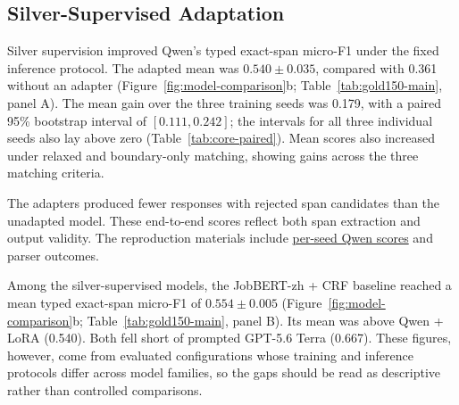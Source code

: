 \subsection{Silver-Supervised Adaptation}
\label{sec:silver-results}

Silver supervision improved Qwen's typed exact-span micro-F1 under the fixed inference protocol. The adapted mean was $0.540\pm0.035$, compared with 0.361 without an adapter (Figure~\ref{fig:model-comparison}b; Table~\ref{tab:gold150-main}, panel A). The mean gain over the three training seeds was 0.179, with a paired 95\% bootstrap interval of $[0.111, 0.242]$; the intervals for all three individual seeds also lay above zero (Table~\ref{tab:core-paired}). Mean scores also increased under relaxed and boundary-only matching, showing gains across the three matching criteria.

The adapters produced fewer responses with rejected span candidates than the unadapted model. These end-to-end scores reflect both span extraction and output validity. The reproduction materials include \href{https://github.com/AlfredJamesLi/chinese-skillspan-benchmark/blob/1d1c24e20ee049fc768034b5baf58fa882e08e2c/reproduction/process_archive_20260924/secondary_review/tables/qwen_per_seed.csv}{per-seed Qwen scores} and parser outcomes.

Among the silver-supervised models, the JobBERT-zh + CRF baseline reached a mean typed exact-span micro-F1 of $0.554\pm0.005$ (Figure~\ref{fig:model-comparison}b; Table~\ref{tab:gold150-main}, panel B). Its mean was above Qwen + LoRA (0.540). Both fell short of prompted GPT-5.6 Terra (0.667). These figures, however, come from evaluated configurations whose training and inference protocols differ across model families, so the gaps should be read as descriptive rather than controlled comparisons.

